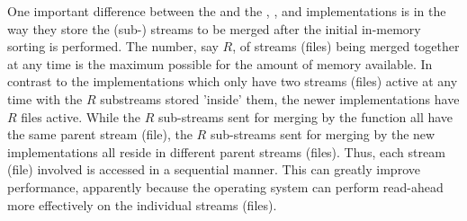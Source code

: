 One important difference between the 
and the , , and
 implementations is in the way they
store the (sub-) streams to be merged after the initial
in-memory sorting is performed. The number, say $R$, of
streams (files) being merged together at any time is the maximum
possible for the amount of memory available. In contrast to
the  implementations which only have
two streams (files) active at any time with the $R$ substreams
stored 'inside' them, the newer implementations have $R$
files active. While the $R$ sub-streams sent
for merging by the  function all have
the same parent stream (file), the $R$ sub-streams sent for merging
by the new implementations all reside in different parent
streams (files). Thus, each stream (file) involved is accessed in a
sequential manner. This can greatly improve performance,
apparently because the operating system can perform
read-ahead more effectively on the individual
streams (files).




